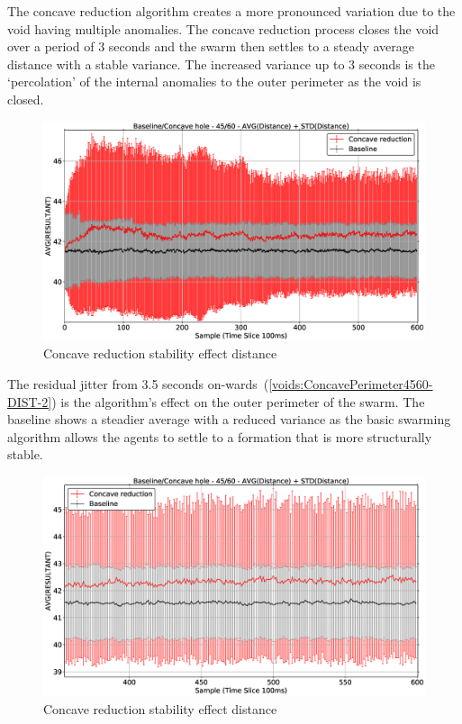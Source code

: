 The concave reduction algorithm creates a more pronounced variation due to the void having multiple anomalies. The concave reduction process closes the void over a period of 3 seconds and the swarm then settles to a steady average distance with a stable variance. The increased variance up to 3 seconds is the `percolation' of the internal anomalies to the outer perimeter as the void is closed.
\begin{figure}[H]
\begin{center}
\includegraphics[width=15cm]{CHAPTER-7/figures/ConcavePerimeter4560-DIST}
\end{center}
\caption{Concave reduction stability effect distance\label{voids:ConcavePerimeter4560-DIST}}
\end{figure}

The residual jitter from 3.5 seconds on-wards~(\autoref{voids:ConcavePerimeter4560-DIST-2}) is the algorithm's effect on the outer perimeter of the swarm. The baseline shows a steadier average with a reduced variance as the basic swarming algorithm allows the agents to settle to a formation that is more structurally stable.
\begin{figure}[H]
\begin{center}
\includegraphics[width=15cm]{CHAPTER-7/figures/ConcavePerimeter4560-DIST-2}
\end{center}
\caption{Concave reduction stability effect distance\label{voids:ConcavePerimeter4560-DIST-2}}
\end{figure}

